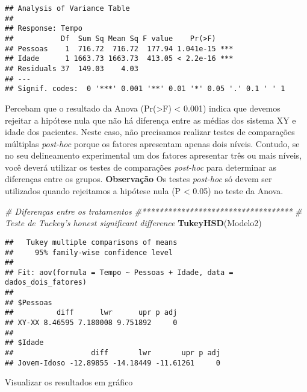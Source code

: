 \documentclass[
]{book}
\newenvironment{Shaded}{\begin{snugshade}}{\end{snugshade}}
\newcommand{\CommentTok}[1]{\textcolor[rgb]{0.56,0.35,0.01}{\textit{#1}}}
\newcommand{\KeywordTok}[1]{\textcolor[rgb]{0.13,0.29,0.53}{\textbf{#1}}}
\newcommand{\NormalTok}[1]{#1}
\begin{document}
\begin{verbatim}
## Analysis of Variance Table
## 
## Response: Tempo
##           Df  Sum Sq Mean Sq F value    Pr(>F)    
## Pessoas    1  716.72  716.72  177.94 1.041e-15 ***
## Idade      1 1663.73 1663.73  413.05 < 2.2e-16 ***
## Residuals 37  149.03    4.03                      
## ---
## Signif. codes:  0 '***' 0.001 '**' 0.01 '*' 0.05 '.' 0.1 ' ' 1
\end{verbatim}

Percebam que o resultado da Anova (Pr(\textgreater F) \textless{} 0.001) indica que devemos rejeitar a hipótese nula que não há diferença entre as médias dos sistema XY e idade dos pacientes. Neste caso, não precisamos realizar testes de comparações múltiplas \emph{post-hoc} porque os fatores apresentam apenas dois níveis. Contudo, se no seu delineamento experimental um dos fatores apresentar três ou mais níveis, você deverá utilizar os testes de comparações \emph{post-hoc} para determinar as diferenças entre os grupos. \textbf{Observação} Os testes \emph{post-hoc} só devem ser utilizados quando rejeitamos a hipótese nula (P \textless{} 0.05) no teste da Anova.

\begin{Shaded}
\begin{Highlighting}[]
\CommentTok{# Diferenças entre os tratamentos}
\CommentTok{#***********************************}
\CommentTok{# Teste de Tuckey's honest significant difference}
\KeywordTok{TukeyHSD}\NormalTok{(Modelo2)}
\end{Highlighting}
\end{Shaded}

\begin{verbatim}
##   Tukey multiple comparisons of means
##     95% family-wise confidence level
## 
## Fit: aov(formula = Tempo ~ Pessoas + Idade, data = dados_dois_fatores)
## 
## $Pessoas
##          diff      lwr      upr p adj
## XY-XX 8.46595 7.180008 9.751892     0
## 
## $Idade
##                  diff       lwr       upr p adj
## Jovem-Idoso -12.89855 -14.18449 -11.61261     0
\end{verbatim}

Visualizar os resultados em gráfico
\end{document}
